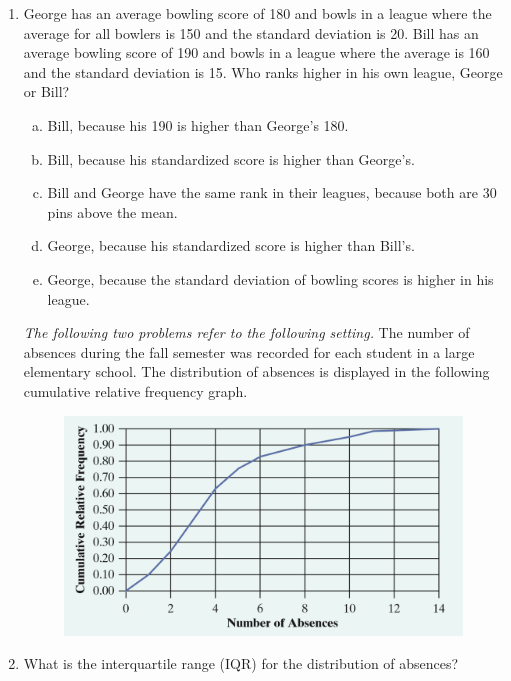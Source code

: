 \documentclass[a4paper,12pt,twoside]{book}
\begin{document}
\begin{itemize}
\begin{enumerate}
    \item George has an average bowling score of 180 and bowls in a league where the average for all bowlers is 150 and the standard deviation is 20. Bill has an average bowling score of 190 and bowls in a league where the average is 160 and the standard deviation is 15. Who ranks higher in his own league, George or Bill?
        
        \begin{enumerate}[(a)]
            \item Bill, because his 190 is higher than George’s 180.
            \item Bill, because his standardized score is higher than George’s.
            \item Bill and George have the same rank in their leagues, because both are 30 pins above the mean.
            \item George, because his standardized score is higher than Bill’s.
            \item George, because the standard deviation of bowling scores is higher in his league.
        \end{enumerate}
        \vspace{0.3cm}
        
    \textit{The following two problems refer to the following setting.} The number of absences during the fall semester was recorded for each student in a large elementary school. The distribution of absences is displayed in the following cumulative relative frequency graph.
    \begin{figure}[H]
        \centering
        \includegraphics[scale=0.4]{figure11}
    \end{figure}

    \item What is the interquartile range (IQR) for the distribution of absences?
    

\end{enumerate}
\end{itemize}
\end{document}
